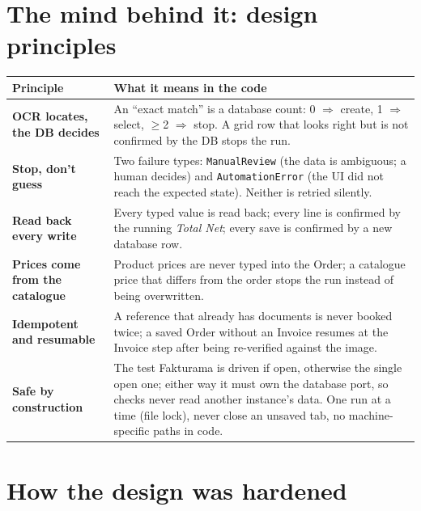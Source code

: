 \documentclass[11pt,a4paper]{article}
\begin{document}
\section{The mind behind it: design principles}
\begin{tabularx}{\linewidth}{@{}>{\raggedright\arraybackslash\bfseries}p{3.9cm}X@{}}
\toprule
Principle & What it means in the code \\
\midrule
OCR locates, the DB decides & An ``exact match'' is a database count: 0 $\Rightarrow$ create, 1 $\Rightarrow$ select,
  $\ge$2 $\Rightarrow$ stop. A grid row that looks right but is not confirmed by the DB stops the run. \\
Stop, don't guess & Two failure types: \texttt{ManualReview} (the data is ambiguous; a human decides) and
  \texttt{AutomationError} (the UI did not reach the expected state). Neither is retried silently. \\
Read back every write & Every typed value is read back; every line is confirmed by the running \emph{Total Net}; every
  save is confirmed by a new database row. \\
Prices come from the catalogue & Product prices are never typed into the Order; a catalogue price that differs from the
  order stops the run instead of being overwritten. \\
Idempotent and resumable & A reference that already has documents is never booked twice; a saved Order without an
  Invoice resumes at the Invoice step after being re-verified against the image. \\
Safe by construction & The test Fakturama is driven if open, otherwise the single open one; either way it must own the
  database port, so checks never read another instance's data. One run
  at a time (file lock), never close an unsaved tab, no machine-specific paths in code. \\
\bottomrule
\end{tabularx}

\section{How the design was hardened}
\end{document}
